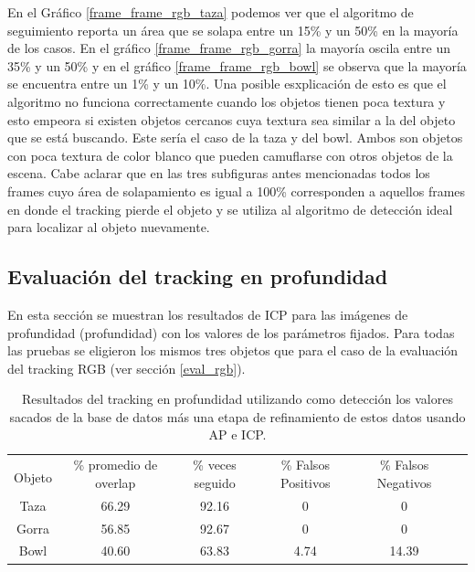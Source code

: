 En el Gráfico \ref{frame_frame_rgb_taza} podemos ver que el algoritmo de seguimiento reporta un área que se solapa entre un 15\% y un 50\% en la mayoría de los casos. En el gráfico \ref{frame_frame_rgb_gorra} la mayoría oscila entre un 35\% y un 50\% y en el gráfico \ref{frame_frame_rgb_bowl} se observa que la mayoría se encuentra entre un 1\% y un 10\%. Una posible esxplicación de esto es que el algoritmo no funciona correctamente cuando los objetos tienen poca textura y esto empeora si existen objetos cercanos cuya textura sea similar a la del objeto que se está buscando. Este sería el caso de la taza y del bowl. Ambos son objetos con poca textura de color blanco que pueden camuflarse con otros objetos de la escena.
Cabe aclarar que en las tres subfiguras antes mencionadas todos los frames cuyo área de solapamiento es igual a 100\% corresponden a aquellos frames en donde el tracking pierde el objeto y se utiliza al algoritmo de detección ideal para localizar al objeto nuevamente.

\subsection{Evaluación del tracking en profundidad}
En esta sección se muestran los resultados de ICP para las imágenes de profundidad (profundidad) con los valores de los parámetros fijados. Para todas las pruebas se eligieron los mismos tres objetos que para el caso de la evaluación del tracking RGB (ver sección \ref{eval_rgb}).

\begin{table}[h]
    \begin{tabular}{|c|c|c|c|c|c|}
    \hline
    & \multirow{2}{2.4cm}{\% promedio de overlap} & \multirow{2}{2cm}{\% veces seguido} & \multirow{2}{1.6cm}{\% Falsos Positivos} & \multirow{2}{1.6cm}{\% Falsos Negativos}\\
	Objeto & & & &\\
    \hline
    Taza   & 66.29      & 92.16      & 0      & 0     \\
    \hline
    Gorra  & 56.85      & 92.67      & 0      & 0     \\
    \hline
    Bowl   & 40.60      & 63.83      & 4.74   & 14.39 \\
    \hline
    \end{tabular}
\caption{Resultados del tracking en profundidad utilizando como detección los valores sacados de la base de datos más una etapa de refinamiento de estos datos usando AP e ICP.}
\label{tabla_d}
\end{table}

